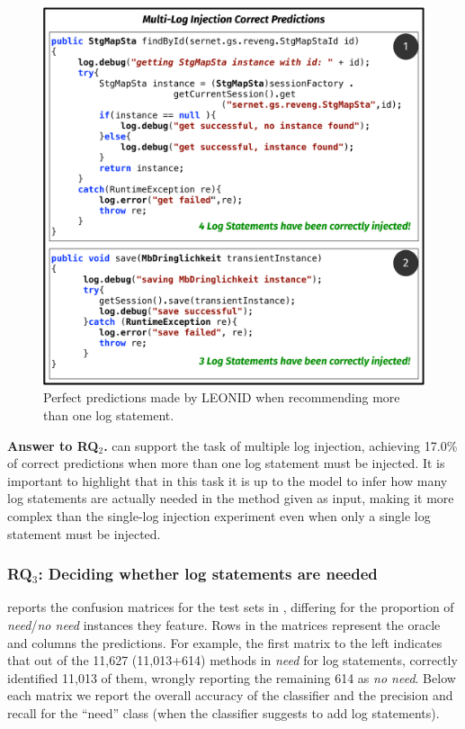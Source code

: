 \begin{figure}[h]
	\centering
	\includegraphics[width=0.70\columnwidth]{img/LEONID-Multi-Examples.pdf}
	\caption{Perfect predictions made by LEONID when recommending more than one log statement.}
	\label{fig:multi-leonid}
\end{figure}


\vspace{0.2cm}
\begin{resultbox}
\textbf{Answer to RQ$_2$.} \approach can support the task of multiple log injection, achieving 17.0\% of correct predictions when more than one log statement must be injected. It is important to highlight that in this task it is up to the model to infer how many log statements are actually needed in the method given as input, making it more complex than the single-log injection experiment even when only a single log statement must be injected.
\end{resultbox}

\subsubsection{RQ$_{3}$: Deciding whether log statements are needed}
\label{sec:rq3}



 reports the confusion matrices for the test sets in , differing for the proportion of \emph{need}/\emph{no need} instances they feature. Rows in the matrices represent the oracle and columns the predictions. For example, the first matrix to the left indicates that out of the 11,627 (11,013+614) methods in \emph{need} for log statements, \approach correctly identified 11,013 of them, wrongly reporting the remaining 614 as \emph{no need}. Below each matrix we report the overall accuracy of the classifier and the precision and recall for the ``need'' class (\ie when the classifier suggests to add log statements).  



